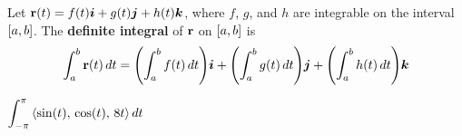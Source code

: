\documentclass[../mathNotesPreamble]{subfiles}
\begin{document}
  \begin{defn*}
    Let ${\mathbf{r}}(t)=f(t){\bm{i}}+g(t){\bm{j}}+h(t){\bm{k}}$, where $f$, $g$, and $h$ are integrable on the interval ${\left[a,b\right]}$. The \textbf{definite integral} of ${\mathbf{r}}$ on ${\left[a,b\right]}$ is
      \[\int_a^b {\mathbf{r}}(t)\,dt={\left(\int_a^b f(t)\,dt\right)}{\bm{i}}+{\left(\int_a^b g(t)\,dt\right)}{\bm{j}}+{\left(\int_a^b h(t)\,dt\right)}{\bm{k}}\]
  \end{defn*}
  \begin{ex*}
    $\displaystyle \int_{-\pi}^{\pi} {\left\langle \sin(t),\,\cos(t),\, 8t \right\rangle}\,dt$
  \end{ex*}
  \pagebreak

  
\end{document}
